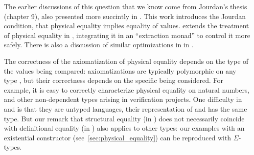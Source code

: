 The earlier discussions of this question that we know come from Jourdan's thesis~\citep{DBLP:phd/hal/Jourdan16} (chapter 9), also presented more succintly in \citep{DBLP:journals/jar/BraibantJM14}.
%
This work introduces the Jourdan condition, that physical equality implies equality of values.
%
\citep{boulme:tel-03356701} extends the treatment of physical equality in \Rocq, integrating it in an ``extraction monad'' to control it more safely.
%
There is also a discussion of similar optimizations in \Lean in \citep{DBLP:journals/pacmpl/SelsamHM20}.

The correctness of the axiomatization of physical equality depends on the type of the values being compared: axiomatizations are typically polymorphic on any type , but their correctness depends on the specific  being considered.
%
For example, it is easy to correctly characterize physical equality on natural numbers, and other non-dependent types arising in \Rocq verification projects.
%
One difficulty in \HeapLang and \ZooLang is that they are untyped languages, their representation of  and  has the same type.
%
But our remark that structural equality (in \OCaml) does not necessarily coincide with definitional equality (in \Rocq) also applies to other \Rocq types: our examples with an existential  constructor (see~\cref{sec:physical_equality}) can be reproduced with $\Sigma$-types.

